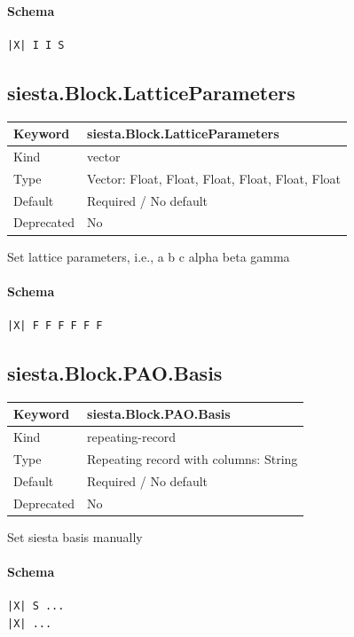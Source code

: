\documentclass[11pt]{article}
\begin{document}
{{{{{\paragraph{Schema}
\begin{Verbatim}
|X| I I S
\end{Verbatim}

\subsection{siesta.Block.LatticeParameters}
\label{kw:siesta-Block-LatticeParameters}
\begin{longtable}{|p{1.5in}|p{4.5in}|}
\hline
Keyword & siesta.Block.LatticeParameters \\
\hline
Kind & vector \\
\hline
Type & Vector: Float, Float, Float, Float, Float, Float \\
\hline
Default & Required / No default \\
\hline
Deprecated & No \\
\hline
\end{longtable}
 Set lattice parameters, i.e.,
 a b c alpha beta gamma

\paragraph{Schema}
\begin{Verbatim}
|X| F F F F F F
\end{Verbatim}

\subsection{siesta.Block.PAO.Basis}
\label{kw:siesta-Block-PAO-Basis}
\begin{longtable}{|p{1.5in}|p{4.5in}|}
\hline
Keyword & siesta.Block.PAO.Basis \\
\hline
Kind & repeating-record \\
\hline
Type & Repeating record with columns: String \\
\hline
Default & Required / No default \\
\hline
Deprecated & No \\
\hline
\end{longtable}
 Set siesta basis manually

\paragraph{Schema}
\begin{Verbatim}
|X| S ...
|X| ...
\end{Verbatim}

}}}}}
\end{document}
